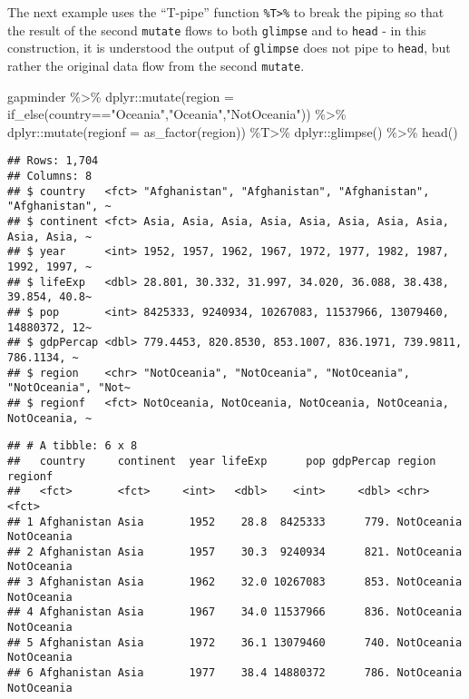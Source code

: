 \documentclass[
]{book}
\newenvironment{Shaded}{\begin{snugshade}}{\end{snugshade}}
\newcommand{\AttributeTok}[1]{\textcolor[rgb]{0.77,0.63,0.00}{#1}}
\newcommand{\FunctionTok}[1]{\textcolor[rgb]{0.00,0.00,0.00}{#1}}
\newcommand{\NormalTok}[1]{#1}
\newcommand{\SpecialCharTok}[1]{\textcolor[rgb]{0.00,0.00,0.00}{#1}}
\newcommand{\StringTok}[1]{\textcolor[rgb]{0.31,0.60,0.02}{#1}}
\begin{document}
The next example uses the ``T-pipe'' function \texttt{\%T\textgreater{}\%} to break the piping so that the result of the second \texttt{mutate} flows to both \texttt{glimpse} and to \texttt{head} - in this construction, it is understood the output of \texttt{glimpse} does not pipe to \texttt{head}, but rather the original data flow from the second \texttt{mutate}.

\begin{Shaded}
\begin{Highlighting}[]
\NormalTok{gapminder }\SpecialCharTok{\%\textgreater{}\%} 
\NormalTok{  dplyr}\SpecialCharTok{::}\FunctionTok{mutate}\NormalTok{(}\AttributeTok{region =} \FunctionTok{if\_else}\NormalTok{(country}\SpecialCharTok{==}\StringTok{"Oceania"}\NormalTok{,}\StringTok{"Oceania"}\NormalTok{,}\StringTok{"NotOceania"}\NormalTok{)) }\SpecialCharTok{\%\textgreater{}\%}
\NormalTok{  dplyr}\SpecialCharTok{::}\FunctionTok{mutate}\NormalTok{(}\AttributeTok{regionf =} \FunctionTok{as\_factor}\NormalTok{(region)) }\SpecialCharTok{\%T\textgreater{}\%}
\NormalTok{  dplyr}\SpecialCharTok{::}\FunctionTok{glimpse}\NormalTok{() }\SpecialCharTok{\%\textgreater{}\%}
  \FunctionTok{head}\NormalTok{()}
\end{Highlighting}
\end{Shaded}

\begin{verbatim}
## Rows: 1,704
## Columns: 8
## $ country   <fct> "Afghanistan", "Afghanistan", "Afghanistan", "Afghanistan", ~
## $ continent <fct> Asia, Asia, Asia, Asia, Asia, Asia, Asia, Asia, Asia, Asia, ~
## $ year      <int> 1952, 1957, 1962, 1967, 1972, 1977, 1982, 1987, 1992, 1997, ~
## $ lifeExp   <dbl> 28.801, 30.332, 31.997, 34.020, 36.088, 38.438, 39.854, 40.8~
## $ pop       <int> 8425333, 9240934, 10267083, 11537966, 13079460, 14880372, 12~
## $ gdpPercap <dbl> 779.4453, 820.8530, 853.1007, 836.1971, 739.9811, 786.1134, ~
## $ region    <chr> "NotOceania", "NotOceania", "NotOceania", "NotOceania", "Not~
## $ regionf   <fct> NotOceania, NotOceania, NotOceania, NotOceania, NotOceania, ~
\end{verbatim}

\begin{verbatim}
## # A tibble: 6 x 8
##   country     continent  year lifeExp      pop gdpPercap region     regionf   
##   <fct>       <fct>     <int>   <dbl>    <int>     <dbl> <chr>      <fct>     
## 1 Afghanistan Asia       1952    28.8  8425333      779. NotOceania NotOceania
## 2 Afghanistan Asia       1957    30.3  9240934      821. NotOceania NotOceania
## 3 Afghanistan Asia       1962    32.0 10267083      853. NotOceania NotOceania
## 4 Afghanistan Asia       1967    34.0 11537966      836. NotOceania NotOceania
## 5 Afghanistan Asia       1972    36.1 13079460      740. NotOceania NotOceania
## 6 Afghanistan Asia       1977    38.4 14880372      786. NotOceania NotOceania
\end{verbatim}
\end{document}
